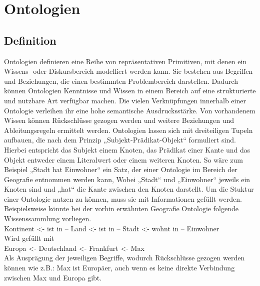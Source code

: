 \chapter{Ontologien}
\section{Definition}
Ontologien definieren eine Reihe von repräsentativen Primitiven, mit denen ein Wissens- oder Diskursbereich modelliert werden kann. Sie bestehen aus Begriffen und Beziehungen, die einen bestimmten Problembereich darstellen. \cite{TomGruber.2009}\newline
Dadurch können Ontologien Kenntnisse und Wissen in einem Bereich auf eine strukturierte und nutzbare Art verfügbar machen. Die vielen Verknüpfungen innerhalb einer Ontologie verleihen ihr eine hohe semantische Ausdrucksstärke. Von vorhandenem Wissen können Rückschlüsse gezogen werden und weitere Beziehungen und Ableitungsregeln ermittelt werden. \cite{WolfgangHesse.2005}\newline
Ontologien lassen sich mit dreiteiligen Tupeln aufbauen, die nach dem Prinzip „Subjekt-Prädikat-Objekt“ formuliert sind. Hierbei entspricht das Subjekt einem Knoten, das Prädikat einer Kante und das Objekt entweder einem Literalwert oder einem weiteren Knoten. So wäre zum Beispiel „Stadt hat Einwohner“ ein Satz, der einer Ontologie im Bereich der Geografie entnommen werden kann, Wobei „Stadt“ und „Einwohner“ jeweils ein Knoten sind und „hat“ die Kante zwischen den Knoten darstellt. \cite{Wikipedia.31.10.201911:12}\newline
Um die Stuktur einer Ontologie nutzen zu können, muss sie mit Informationen gefüllt werden. Beispielsweise könnte bei der vorhin erwähnten Geografie Ontologie folgende Wissenssammlung vorliegen.\\

Kontinent <- ist in – Land <- ist in – Stadt <- wohnt in – Einwohner \\

Wird gefüllt mit \\

Europa <- Deutschland <- Frankfurt <- Max \\

Als Ausprägung der jeweiligen Begriffe, wodurch Rückschlüsse gezogen werden können wie z.B.: Max ist Europäer, auch wenn es keine direkte Verbindung zwischen Max und Europa gibt.
